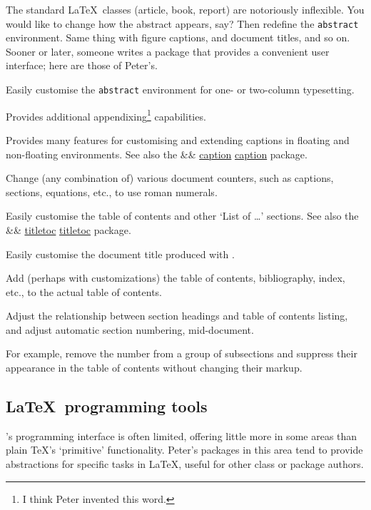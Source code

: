 \documentclass[final]{ltugboat}
\newcommand\pkg[2][]{%
  \ifx&#1&%
    \href{http://tug.ctan.org/pkg/#2}{\textsf{#2}}%
  \else
    \href{http://tug.ctan.org/pkg/#1}{\textsf{#2}}%
  \fi
}
\begin{document}
The standard \LaTeX\ classes (\textsf{article}, \textsf{book}, \textsf{report}) are notoriously inflexible. You would like to change how the abstract appears, say? Then redefine the \texttt{abstract} environment. Same thing with figure captions, and document titles, and so on. Sooner or later, someone writes a package that provides a convenient user interface; here are those of Peter's.

\begin{description}[font=\normalfont]
\item [\pkg{abstract}] Easily customise the \texttt{abstract} environment for one- or two-column typesetting.
\item [\pkg{appendix}] Provides additional appendixing\footnote{I think Peter invented this word.} capabilities.
\item [\pkg{ccaption}] Provides many features for customising and extending captions in floating and non-floating environments. See also the \pkg{caption} package.
\item [\pkg{romannum}] Change (any combination of) various document counters, such as captions, sections, equations, etc., to use roman numerals.
\item [\pkg{tocloft}] Easily customise the table of contents and other `List of \dots' sections. See also the \pkg{titletoc} package.
\item [\pkg{titling}] Easily customise the document title produced with .
\item [\pkg{tocbibind}] Add (perhaps with customizations) the table of contents, bibliography, index, etc., to the actual table of contents.
\item [\pkg{tocvsec2}] Adjust the relationship between section headings and table of contents listing, and adjust automatic section numbering, mid-document.

For example, remove the number from a group of subsections and suppress their appearance in the table of contents without changing their markup.
\end{description}

\subsection{\LaTeX\ programming tools}

\LaTeXe's programming interface is often limited, offering little more in some areas than plain \TeX's `primitive' functionality. Peter's packages in this area tend to provide abstractions for specific tasks in \LaTeX, useful for other class or package authors.
\end{document}
